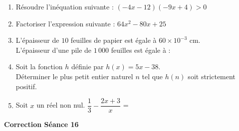\documentclass[a4paper,11pt]{article}
\begin{document}
\begin{seanceD}{} %

\begin{enumerate}
\item Résoudre l'inéquation suivante : $(-4x-12)(-9x+4)>0$ \dotfill

\dotfill

\dotfill

\dotfill

\item Factoriser l'expression suivante : $64x^2-80x+25$ \dotfill

\item L'épaisseur de $10$ feuilles de papier est égale à $60 \times 10^{-3}$ cm.\\L'épaisseur d'une pile de $1\,000$ feuilles est égale à :

\dotfill

\dotfill

\item Soit la fonction $h$ 
    définie par $h(x)=5x-38$.\\
    Déterminer le plus  petit  entier naturel $n$ tel que $h(n)$ soit strictement positif. \dotfill
    
    \dotfill

\item Soit $x$ un réel non nul. $\dfrac{1}{3}-\dfrac{2x+3}{x}$  = \dotfill

\dotfill

\dotfill

\end{enumerate}

\end{seanceD}

\vspace{0.5cm}
\begin{center}

\textbf{\textcolor{Couleur8}{Correction Séance 16}}\\
\vspace{2mm}

\end{center}

\newpage

\end{document}
